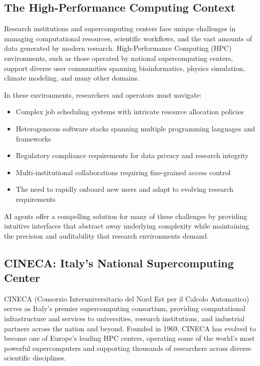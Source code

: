 \documentclass[a4paper,twoside]{sapthesis}
\begin{document}
\subsection{The High-Performance Computing Context}

Research institutions and supercomputing centers face unique challenges in managing computational resources, scientific workflows, and the vast amounts of data generated by modern research. High-Performance Computing (HPC) environments, such as those operated by national supercomputing centers, support diverse user communities spanning bioinformatics, physics simulation, climate modeling, and many other domains.

In these environments, researchers and operators must navigate:

\begin{itemize}
    \item Complex job scheduling systems with intricate resource allocation policies
    \item Heterogeneous software stacks spanning multiple programming languages and frameworks
    \item Regulatory compliance requirements for data privacy and research integrity
    \item Multi-institutional collaborations requiring fine-grained access control
    \item The need to rapidly onboard new users and adapt to evolving research requirements
\end{itemize}

AI agents offer a compelling solution for many of these challenges by providing intuitive interfaces that abstract away underlying complexity while maintaining the precision and auditability that research environments demand.

\subsection{CINECA: Italy's National Supercomputing Center}

CINECA (Consorzio Interuniversitario del Nord Est per il Calcolo Automatico)~\cite{cineca2023} serves as Italy's premier supercomputing consortium, providing computational infrastructure and services to universities, research institutions, and industrial partners across the nation and beyond. Founded in 1969, CINECA has evolved to become one of Europe's leading HPC centers, operating some of the world's most powerful supercomputers and supporting thousands of researchers across diverse scientific disciplines.
\end{document}
